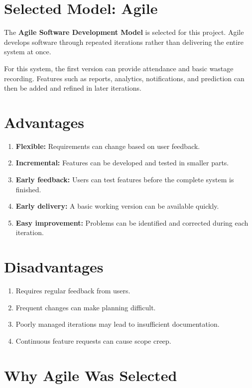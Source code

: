 \documentclass[12pt,a4paper]{report}
\begin{document}
	\section{Selected Model: Agile}
	
	The \textbf{Agile Software Development Model} is selected for this project. Agile develops software through repeated iterations rather than delivering the entire system at once.
	
	For this system, the first version can provide attendance and basic wastage recording. Features such as reports, analytics, notifications, and prediction can then be added and refined in later iterations.
	
	\section{Advantages}
	
	\begin{enumerate}[leftmargin=*]
		\item \textbf{Flexible:} Requirements can change based on user feedback.
		\item \textbf{Incremental:} Features can be developed and tested in smaller parts.
		\item \textbf{Early feedback:} Users can test features before the complete system is finished.
		\item \textbf{Early delivery:} A basic working version can be available quickly.
		\item \textbf{Easy improvement:} Problems can be identified and corrected during each iteration.
	\end{enumerate}
	
	\section{Disadvantages}
	
	\begin{enumerate}[leftmargin=*]
		\item Requires regular feedback from users.
		\item Frequent changes can make planning difficult.
		\item Poorly managed iterations may lead to insufficient documentation.
		\item Continuous feature requests can cause scope creep.
		
	\end{enumerate}
	
	\section{Why Agile Was Selected}
	
\end{document}
